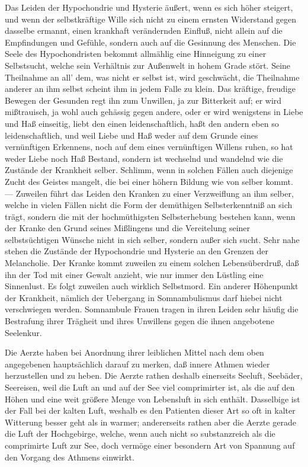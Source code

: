 Das Leiden der Hypochondrie und Hysterie äußert, wenn es sich höher steigert, und wenn der selbstkräftige Wille sich nicht zu einem ernsten Widerstand gegen dasselbe ermannt, einen krankhaft verändernden Einfluß, nicht allein auf die Empfindungen und Gefühle, sondern auch auf die Gesinnung des Menschen. Die Seele des Hypochondristen bekommt allmählig eine Hinneigung zu einer Selbstsucht, welche sein Verhältnis zur Außenwelt in hohem Grade stört. Seine Theilnahme an all’ dem, was nicht er selbst ist, wird geschwächt, die Theilnahme anderer an ihm selbst scheint ihm in jedem Falle zu klein. Das kräftige, freudige Bewegen der Gesunden regt ihn zum Unwillen, ja zur Bitterkeit auf; er wird mißtrauisch, ja wohl auch gehässig gegen andere, oder er wird wenigstens in Liebe und Haß einseitig, liebt den einen leidenschaftlich, haßt den andern eben so leidenschaftlich, und weil Liebe und Haß weder auf dem Grunde eines vernünftigen Erkennens, noch auf dem eines vernünftigen Willens ruhen, so hat weder Liebe noch Haß Bestand, sondern ist wechselnd und wandelnd wie die Zustände der Krankheit selber. Schlimm, wenn in solchen Fällen auch diejenige Zucht des Geistes mangelt, die bei einer höhern Bildung wie von selber kommt. — Zuweilen führt das Leiden den Kranken zu einer Verzweiflung an ihm selber, welche in vielen Fällen nicht die Form der demüthigen Selbsterkenntniß an
sich trägt, sondern die mit der hochmüthigsten Selbsterhebung bestehen kann, wenn der Kranke den Grund seines Mißlingens und die Vereitelung seiner selbstsüchtigen Wünsche nicht in sich selber, sondern außer sich sucht. Sehr nahe stehen die Zustände der Hypochondrie und Hysterie an den Grenzen der Melancholie. Der Kranke kommt zuweilen zu einem solchen Lebensüberdruß, daß ihn der Tod mit einer Gewalt anzieht, wie nur immer den Lüstling eine Sinnenlust. Es folgt zuweilen auch wirklich Selbstmord. Ein anderer Höhenpunkt der Krankheit, nämlich der Uebergang in Somnambulismus darf hiebei nicht verschwiegen werden. Somnambule Frauen tragen in ihren Leiden sehr häufig die Bestrafung ihrer Trägheit und ihres Unwillens gegen die ihnen angebotene Seelenkur.

Die Aerzte haben bei Anordnung ihrer leiblichen Mittel nach dem oben angegebenen hauptsächlich darauf zu merken, daß innere Athmen wieder herzustellen und zu heben. Die Aerzte rathen deshalb einerseits Seeluft, Seebäder, Seereisen, weil die Luft an und auf der See viel comprimirter ist, als die auf den Höhen und eine weit größere Menge von Lebensluft in sich enthält. Dasselbige ist der Fall bei der kalten Luft, weshalb es den Patienten dieser Art so oft in kalter Witterung besser geht als in warmer; andererseits rathen aber die Aerzte gerade die Luft der Hochgebirge, welche, wenn auch nicht so substanzreich als die comprimirte Luft zur See, doch vermöge einer besondern Art von Spannung auf den Vorgang des Athmens einwirkt.

